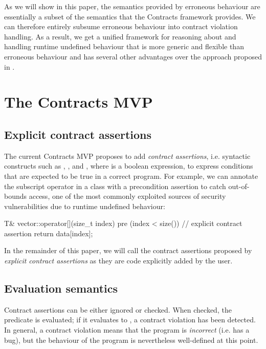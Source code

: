 As we will show in this paper, the semantics provided by erroneous behaviour are essentially a subset of the semantics that the Contracts framework provides. We can therefore entirely subsume erroneous behaviour into contract violation handling. As a result, we get a unified framework for reasoning about and handling runtime undefined behaviour that is more generic and flexible than erroneous behaviour and has several other advantages over the approach proposed in \cite{P2795R5}.

\section{The Contracts MVP}
\subsection{Explicit contract assertions}

The current Contracts MVP \cite{P2900R7} proposes to add \emph{contract assertions}, i.e. syntactic constructs such as , , and , where  is a boolean expression, to express conditions that are expected to be true in a correct program. For example, we can annotate the subscript operator in a  class with a precondition assertion to catch out-of-bounds access, one of the most commonly exploited sources of security vulnerabilities due to runtime undefined behaviour:
\begin{codeblock}
T& vector::operator[](size_t index)
pre (index < size()) {  // explicit contract assertion
  return data[index];     
}
\end{codeblock}

In the remainder of this paper, we will call the contract assertions proposed by  \cite{P2900R7} \emph{explicit contract assertions} as they are code explicitly added by the user.

\subsection{Evaluation semantics}

Contract assertions can be either ignored or checked. When checked, the predicate  is evaluated; if it evaluates to , a contract violation has been detected. In general, a contract violation means that the program is \emph{incorrect} (i.e. has a bug), but the behaviour of the program is nevertheless well-defined at this point. 

